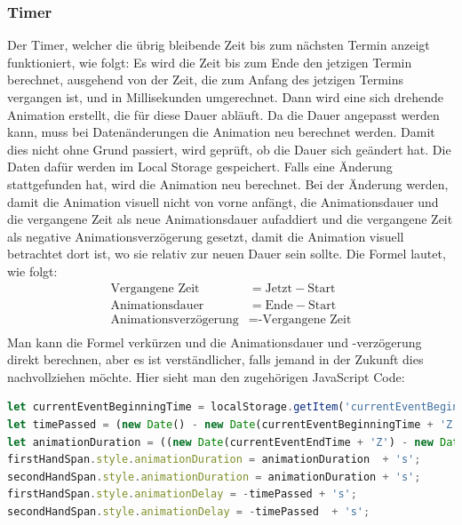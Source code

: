 \subsubsection{Timer}
Der Timer, welcher die übrig bleibende Zeit bis zum nächsten Termin anzeigt funktioniert, wie folgt:
\newline
\newline
Es wird die Zeit bis zum Ende den jetzigen Termin berechnet, ausgehend von der Zeit, die zum Anfang des jetzigen Termins vergangen ist, und in Millisekunden umgerechnet.
Dann wird eine sich drehende Animation erstellt, die für diese Dauer abläuft.
\newline
Da die Dauer angepasst werden kann, muss bei Datenänderungen die Animation neu berechnet werden.
Damit dies nicht ohne Grund passiert, wird geprüft, ob die Dauer sich geändert hat.
Die Daten dafür werden im Local Storage gespeichert.
Falls eine Änderung stattgefunden hat, wird die Animation neu berechnet.
Bei der Änderung werden, damit die Animation visuell nicht von vorne anfängt, die Animationsdauer und die vergangene Zeit als neue Animationsdauer aufaddiert und die vergangene Zeit als negative Animationsverzögerung gesetzt, damit die Animation visuell betrachtet dort ist, wo sie relativ zur neuen Dauer sein sollte.
\newline
\newline
Die Formel lautet, wie folgt:
\newline
\newline
\begin{equation}
\begin{aligned}
    \text{Vergangene Zeit} &= \text{Jetzt} - \text{Start} \\
\text{Animationsdauer} &= \text{Ende} - \text{Start} \\
    \text {Animationsverzögerung} &= \text{-Vergangene Zeit} \\
\end{aligned}
\end{equation}
\newline
\newline
Man kann die Formel verkürzen und die Animationsdauer und -verzögerung direkt berechnen, aber es ist verständlicher, falls jemand in der Zukunft dies nachvollziehen möchte.
\newline
\newline
Hier sieht man den zugehörigen JavaScript Code:
\newline
\newline
\begin{lstlisting}[language=javascript,label={lst:JavaScript Timer}]
let currentEventBeginningTime = localStorage.getItem('currentEventBeginningTime');
let timePassed = (new Date() - new Date(currentEventBeginningTime + 'Z')) / 1000;
let animationDuration = ((new Date(currentEventEndTime + 'Z') - new Date(currentEventBeginningTime + 'Z')) / 1000);
firstHandSpan.style.animationDuration = animationDuration  + 's';
secondHandSpan.style.animationDuration = animationDuration + 's';
firstHandSpan.style.animationDelay = -timePassed + 's';
secondHandSpan.style.animationDelay = -timePassed  + 's';
\end{lstlisting}
